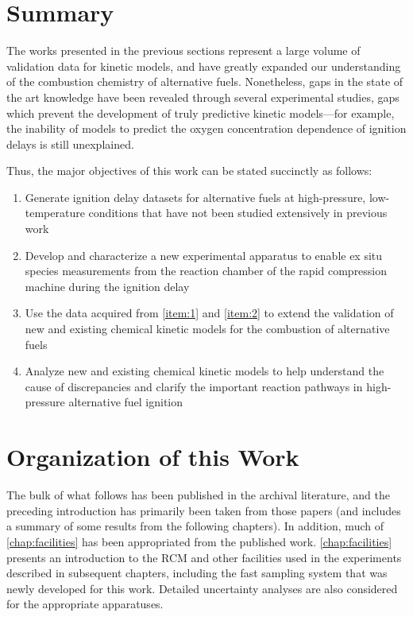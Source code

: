 \documentclass[../main.tex]{subfiles}
\begin{document}
\section{Summary}

The works presented in the previous sections represent a large volume
of validation data for kinetic models, and have greatly expanded our
understanding of the combustion chemistry of alternative fuels.
Nonetheless, gaps in the state of the art knowledge have been revealed
through several experimental studies, gaps which prevent the development
of truly predictive kinetic models---for example, the inability of
models to predict the oxygen concentration dependence of ignition delays
is still unexplained.

Thus, the major objectives of this work can be stated succinctly as
follows:

\begin{enumerate}
\item \label{item:1} Generate ignition delay datasets for alternative
fuels at high-pressure, low-temperature conditions that have not been
studied extensively in previous work

\item \label{item:2} Develop and characterize a new experimental
apparatus to enable ex situ species measurements from the reaction
chamber of the rapid compression machine during the ignition delay

\item Use the data acquired from \cref{item:1} and \cref{item:2}
to extend the validation of new and existing chemical kinetic models
for the combustion of alternative fuels

\item Analyze new and existing chemical kinetic models to help
understand the cause of discrepancies and clarify the important
reaction pathways in high-pressure alternative fuel ignition
\end{enumerate}

\section{Organization of this Work}

The bulk of what follows has been published in the archival literature,
and the preceding introduction has primarily been taken from those
papers (and includes a summary of some results from the following
chapters). In addition, much of \cref{chap:facilities} has been
appropriated from the published work. \cref{chap:facilities} presents an
introduction to the RCM and other facilities used in the experiments
described in subsequent chapters, including the fast sampling system
that was newly developed for this work. Detailed uncertainty analyses
are also considered for the appropriate apparatuses.
\end{document}
